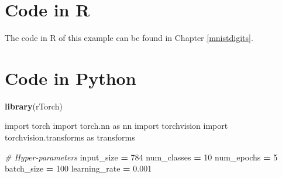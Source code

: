 \documentclass[]{book}
\newenvironment{Shaded}{\begin{snugshade}}{\end{snugshade}}
\newcommand{\CommentTok}[1]{\textcolor[rgb]{0.56,0.35,0.01}{\textit{#1}}}
\newcommand{\DecValTok}[1]{\textcolor[rgb]{0.00,0.00,0.81}{#1}}
\newcommand{\FloatTok}[1]{\textcolor[rgb]{0.00,0.00,0.81}{#1}}
\newcommand{\ImportTok}[1]{#1}
\newcommand{\KeywordTok}[1]{\textcolor[rgb]{0.13,0.29,0.53}{\textbf{#1}}}
\newcommand{\NormalTok}[1]{#1}
\newcommand{\OperatorTok}[1]{\textcolor[rgb]{0.81,0.36,0.00}{\textbf{#1}}}
\begin{document}
\hypertarget{code-in-r}{%
\section{Code in R}\label{code-in-r}}

The code in R of this example can be found in Chapter \ref{mnistdigits}.

\hypertarget{code-in-python}{%
\section{Code in Python}\label{code-in-python}}

\begin{Shaded}
\begin{Highlighting}[]
\KeywordTok{library}\NormalTok{(rTorch)}
\end{Highlighting}
\end{Shaded}

\begin{Shaded}
\begin{Highlighting}[]
\ImportTok{import}\NormalTok{ torch}
\ImportTok{import}\NormalTok{ torch.nn }\ImportTok{as}\NormalTok{ nn}
\ImportTok{import}\NormalTok{ torchvision}
\ImportTok{import}\NormalTok{ torchvision.transforms }\ImportTok{as}\NormalTok{ transforms}
\end{Highlighting}
\end{Shaded}

\begin{Shaded}
\begin{Highlighting}[]
\CommentTok{# Hyper-parameters }
\NormalTok{input_size }\OperatorTok{=} \DecValTok{784}
\NormalTok{num_classes }\OperatorTok{=} \DecValTok{10}
\NormalTok{num_epochs }\OperatorTok{=} \DecValTok{5}
\NormalTok{batch_size }\OperatorTok{=} \DecValTok{100}
\NormalTok{learning_rate }\OperatorTok{=} \FloatTok{0.001}
\end{Highlighting}
\end{Shaded}
\end{document}
